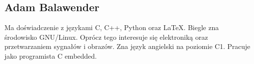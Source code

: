 \subsection{Adam Balawender}
Ma doświadczenie z językami C, C++, Python oraz LaTeX. Biegle zna środowisko GNU/Linux. Oprócz tego interesuje się elektroniką oraz przetwarzaniem sygnałów i obrazów. Zna język angielski na poziomie C1. Pracuje jako programista C embedded.
